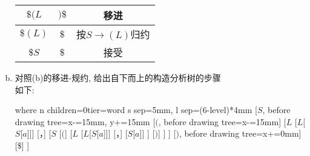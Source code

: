 \documentclass[UTF8]{article}
\begin{document}
\begin{enumerate}[(a) ]
\begin{tabular}{c|c|c}
	\hline
	$\$(L$ & $)\$$ & 移进 \\
	\hline
	$\$(L)$ & $\$$ & 按$S\rightarrow (L)$归约 \\
	\hline
	$\$S$ & $\$$ & 接受 \\
	\hline
	\end{tabular}
\item 对照(b)的移进-规约, 给出自下而上的构造分析树的步骤\\
	如下:\\
	\begin{forest}
	where n children=0{tier=word} {s sep=5mm, l sep=(6-level)*4mm}
	[$S$, before drawing tree={x-=15mm, y+=15mm}
		[$($, before drawing tree={x-=15mm}]
		[$L$
			[$L$[$S$[$a$]]]
			[，]
			[$S$
				[$($]
				[$L$
					[$L$[$S$[$a$]]]
					[，]
					[$S$[$a$]]
				]
				[$)$]
			]
		]
		[$)$, before drawing tree={x+=0mm}]
		[$\$$]
	]
	\end{forest}
\end{enumerate}
\end{document}
